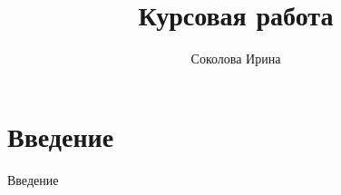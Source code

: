 \documentclass[12pt]{book}
\title{Курсовая работа}
\author{Соколова Ирина}
\numberwithin{exercise}{chapter}
\begin{document}
\pagestyle{plain}
\makeatletter

\section{Введение}

Введение

\makeatother
\end{document}
